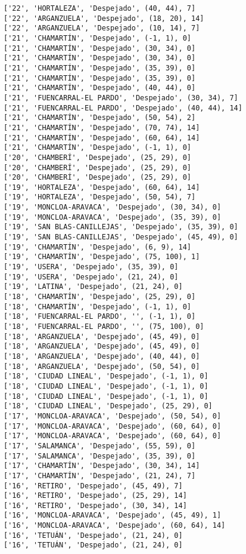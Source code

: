 \documentclass[11pt]{article}
\begin{document}
\begin{Verbatim}[commandchars=\\\{\}]
['22', 'HORTALEZA', 'Despejado', (40, 44), 7]
['22', 'ARGANZUELA', 'Despejado', (18, 20), 14]
['22', 'ARGANZUELA', 'Despejado', (10, 14), 7]
['21', 'CHAMARTÍN', 'Despejado', (-1, 1), 0]
['21', 'CHAMARTÍN', 'Despejado', (30, 34), 0]
['21', 'CHAMARTÍN', 'Despejado', (30, 34), 0]
['21', 'CHAMARTÍN', 'Despejado', (35, 39), 0]
['21', 'CHAMARTÍN', 'Despejado', (35, 39), 0]
['21', 'CHAMARTÍN', 'Despejado', (40, 44), 0]
['21', 'FUENCARRAL-EL PARDO', 'Despejado', (30, 34), 7]
['21', 'FUENCARRAL-EL PARDO', 'Despejado', (40, 44), 14]
['21', 'CHAMARTÍN', 'Despejado', (50, 54), 2]
['21', 'CHAMARTÍN', 'Despejado', (70, 74), 14]
['21', 'CHAMARTÍN', 'Despejado', (60, 64), 14]
['21', 'CHAMARTÍN', 'Despejado', (-1, 1), 0]
['20', 'CHAMBERÍ', 'Despejado', (25, 29), 0]
['20', 'CHAMBERÍ', 'Despejado', (25, 29), 0]
['20', 'CHAMBERÍ', 'Despejado', (25, 29), 0]
['19', 'HORTALEZA', 'Despejado', (60, 64), 14]
['19', 'HORTALEZA', 'Despejado', (50, 54), 7]
['19', 'MONCLOA-ARAVACA', 'Despejado', (30, 34), 0]
['19', 'MONCLOA-ARAVACA', 'Despejado', (35, 39), 0]
['19', 'SAN BLAS-CANILLEJAS', 'Despejado', (35, 39), 0]
['19', 'SAN BLAS-CANILLEJAS', 'Despejado', (45, 49), 0]
['19', 'CHAMARTÍN', 'Despejado', (6, 9), 14]
['19', 'CHAMARTÍN', 'Despejado', (75, 100), 1]
['19', 'USERA', 'Despejado', (35, 39), 0]
['19', 'USERA', 'Despejado', (21, 24), 0]
['19', 'LATINA', 'Despejado', (21, 24), 0]
['18', 'CHAMARTÍN', 'Despejado', (25, 29), 0]
['18', 'CHAMARTÍN', 'Despejado', (-1, 1), 0]
['18', 'FUENCARRAL-EL PARDO', '', (-1, 1), 0]
['18', 'FUENCARRAL-EL PARDO', '', (75, 100), 0]
['18', 'ARGANZUELA', 'Despejado', (45, 49), 0]
['18', 'ARGANZUELA', 'Despejado', (45, 49), 0]
['18', 'ARGANZUELA', 'Despejado', (40, 44), 0]
['18', 'ARGANZUELA', 'Despejado', (50, 54), 0]
['18', 'CIUDAD LINEAL', 'Despejado', (-1, 1), 0]
['18', 'CIUDAD LINEAL', 'Despejado', (-1, 1), 0]
['18', 'CIUDAD LINEAL', 'Despejado', (-1, 1), 0]
['18', 'CIUDAD LINEAL', 'Despejado', (25, 29), 0]
['17', 'MONCLOA-ARAVACA', 'Despejado', (50, 54), 0]
['17', 'MONCLOA-ARAVACA', 'Despejado', (60, 64), 0]
['17', 'MONCLOA-ARAVACA', 'Despejado', (60, 64), 0]
['17', 'SALAMANCA', 'Despejado', (55, 59), 0]
['17', 'SALAMANCA', 'Despejado', (35, 39), 0]
['17', 'CHAMARTÍN', 'Despejado', (30, 34), 14]
['17', 'CHAMARTÍN', 'Despejado', (21, 24), 7]
['16', 'RETIRO', 'Despejado', (45, 49), 7]
['16', 'RETIRO', 'Despejado', (25, 29), 14]
['16', 'RETIRO', 'Despejado', (30, 34), 14]
['16', 'MONCLOA-ARAVACA', 'Despejado', (45, 49), 1]
['16', 'MONCLOA-ARAVACA', 'Despejado', (60, 64), 14]
['16', 'TETUÁN', 'Despejado', (21, 24), 0]
['16', 'TETUÁN', 'Despejado', (21, 24), 0]

\end{Verbatim}
\end{document}
